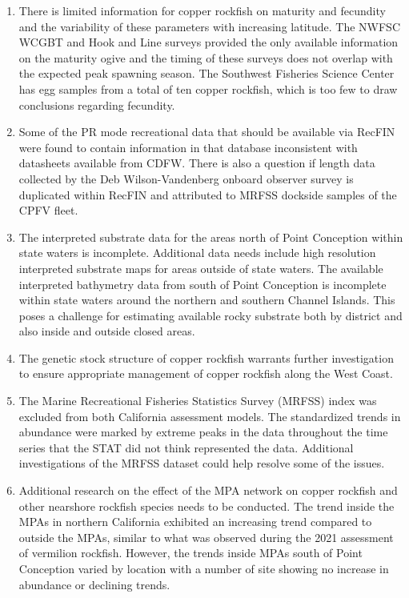 \documentclass[11pt,
  english,
  letterpaper,
]{article}
\begin{document}
\begin{enumerate}
    \item There is limited information for copper rockfish on maturity and fecundity and the variability of these parameters with increasing latitude.  The NWFSC WCGBT and Hook and Line surveys provided the only available information on the maturity ogive and the timing of these surveys does not overlap with the expected peak spawning season. The Southwest Fisheries Science Center has egg samples from a total of ten copper rockfish, which is too few to draw conclusions regarding fecundity.

    \item Some of the PR mode recreational data that should be available via RecFIN were found to contain information in that database inconsistent with datasheets available from CDFW. There is also a question if length data collected by the Deb Wilson-Vandenberg onboard observer survey is duplicated within RecFIN and attributed to MRFSS dockside samples of the CPFV fleet.

    \item The interpreted substrate data for the areas north of Point Conception within state waters is incomplete. Additional data needs include high resolution interpreted substrate maps for areas outside of state waters. The available interpreted bathymetry data from south of Point Conception is incomplete within state waters  around the northern and southern Channel Islands. This poses a challenge for estimating available rocky substrate both by district and also inside and outside closed areas. 

    \item The genetic stock structure of copper rockfish warrants further investigation to ensure appropriate management of copper rockfish along the West Coast. 

    \item The Marine Recreational Fisheries Statistics Survey (MRFSS) index was excluded from both California assessment models. The standardized trends in abundance were marked by extreme peaks in the data throughout the time series that the STAT did not think represented the data. Additional investigations of the MRFSS dataset could help resolve some of the issues.

 \item Additional research on the effect of the MPA network on copper rockfish and other nearshore rockfish species needs to be conducted. The trend inside the MPAs in northern California exhibited an increasing trend compared to outside the MPAs, similar to what was observed during the 2021 assessment of vermilion rockfish. However, the trends inside MPAs south of Point Conception varied by location with a number of site showing no increase in abundance or declining trends.  


\end{enumerate}
\end{document}
